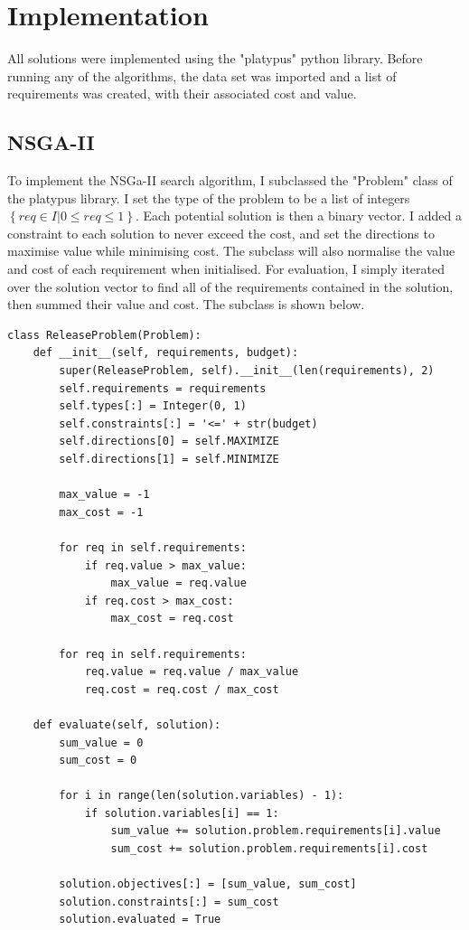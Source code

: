 \documentclass[12pt]{article}
\begin{document}
\section{Implementation}
All solutions were implemented using the "platypus" python library. Before running any of the algorithms, the data set was imported and a list of requirements was created, with their associated cost and value.

\subsection{NSGA-II}
To implement the NSGa-II search algorithm, I subclassed the "Problem" class of the platypus library. I set the type of the problem to be a list of integers $ \left\{ req\in I | 0\leq req\leq 1 \right\} $. Each potential solution is then a binary vector. I added a constraint to each solution to never exceed the cost, and set the directions to maximise value while minimising cost. The subclass will also normalise the value and cost of each requirement when initialised. For evaluation, I simply iterated over the solution vector to find all of the requirements contained in the solution, then summed their value and cost. The subclass is shown below.

\begin{lstlisting}
class ReleaseProblem(Problem):
    def __init__(self, requirements, budget):
        super(ReleaseProblem, self).__init__(len(requirements), 2)
        self.requirements = requirements
        self.types[:] = Integer(0, 1)
        self.constraints[:] = '<=' + str(budget)
        self.directions[0] = self.MAXIMIZE
        self.directions[1] = self.MINIMIZE

        max_value = -1
        max_cost = -1

        for req in self.requirements:
            if req.value > max_value:
                max_value = req.value
            if req.cost > max_cost:
                max_cost = req.cost

        for req in self.requirements:
            req.value = req.value / max_value
            req.cost = req.cost / max_cost

    def evaluate(self, solution):
        sum_value = 0
        sum_cost = 0

        for i in range(len(solution.variables) - 1):
            if solution.variables[i] == 1:
                sum_value += solution.problem.requirements[i].value
                sum_cost += solution.problem.requirements[i].cost

        solution.objectives[:] = [sum_value, sum_cost]
        solution.constraints[:] = sum_cost
        solution.evaluated = True
\end{lstlisting}
\end{document}
